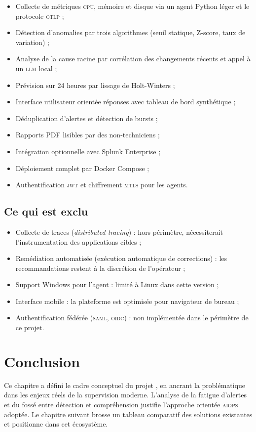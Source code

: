 \begin{itemize}
  \item Collecte de métriques \textsc{cpu}, mémoire et disque via un agent Python
    léger et le protocole \textsc{otlp} ;
  \item Détection d'anomalies par trois algorithmes (seuil statique, Z-score,
    taux de variation) ;
  \item Analyse de la cause racine par corrélation des changements récents et
    appel à un \textsc{llm} local ;
  \item Prévision sur 24 heures par lissage de Holt-Winters ;
  \item Interface utilisateur orientée réponses avec tableau de bord synthétique ;
  \item Déduplication d'alertes et détection de bursts ;
  \item Rapports PDF lisibles par des non-techniciens ;
  \item Intégration optionnelle avec Splunk Enterprise ;
  \item Déploiement complet par Docker Compose ;
  \item Authentification \textsc{jwt} et chiffrement \textsc{mtls} pour les agents.
\end{itemize}

\subsection{Ce qui est exclu}

\begin{itemize}
  \item Collecte de traces (\textit{distributed tracing}) : hors périmètre,
    nécessiterait l'instrumentation des applications cibles ;
  \item Remédiation automatisée (exécution automatique de corrections) :
    les recommandations restent à la discrétion de l'opérateur ;
  \item Support Windows pour l'agent : limité à Linux dans cette version ;
  \item Interface mobile : la plateforme est optimisée pour navigateur de bureau ;
  \item Authentification fédérée (\textsc{saml}, \textsc{oidc}) :
    non implémentée dans le périmètre de ce projet.
\end{itemize}

\section*{Conclusion}

Ce chapitre a défini le cadre conceptuel du projet \caimp{}, en ancrant la
problématique dans les enjeux réels de la supervision moderne. L'analyse de la
fatigue d'alertes et du fossé entre détection et compréhension justifie
l'approche orientée \textsc{aiops} adoptée. Le chapitre suivant brosse un tableau
comparatif des solutions existantes et positionne \caimp{} dans cet écosystème.
